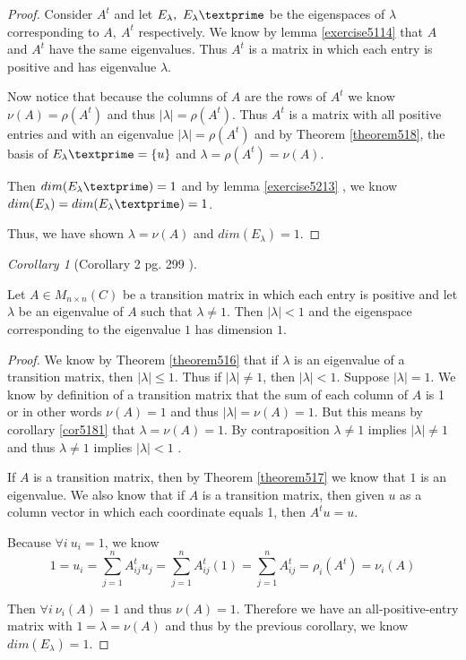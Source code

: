 \documentclass{amsart}
\theoremstyle{definition}
\theoremstyle{remark}
\newtheorem{corollary}{Corollary}[theorem]
\numberwithin{equation}{section}
\begin{document}
\begin{proof}

	Consider $A^t$ and let $E_{\lambda},\ E_{\lambda}\textprime$ be the eigenspaces of $\lambda$ corresponding to $A,\ A^t$ respectively.
	We know by lemma \ref{exercise5114} that $A$ and $A^t$ have the same eigenvalues.
	Thus $A^t$ is a matrix in which each entry is positive and has eigenvalue $\lambda$.

	Now notice that because the columns of $A$ are the rows of $A^t$ we know $\nu(A) = \rho(A^t)$ and thus $|\lambda| = \rho(A^t)$.  Thus $A^t$ is a matrix with all positive entries and with an eigenvalue $|\lambda| = \rho(A^t)$ and by Theorem \ref{theorem518}, the basis of $E_{\lambda}\textprime = \{ u \}$ and $\lambda = \rho(A^t) = \nu(A)$.
	
	Then $dim(E_{\lambda}\textprime) = 1$ and by lemma \ref{exercise5213} , we know $dim(E_{\lambda}) = dim(E_{\lambda}\textprime) = 1$.
	
	Thus, we have shown $\lambda = \nu(A)$ and $dim(E_{\lambda}) = 1$.

\end{proof}



\begin{corollary}[Corollary 2 pg. 299 \cite{friedberg2003linear}]\label{cor5182}

	Let $A \in M_{n \times n}(C)$ be a transition matrix in which each entry is positive and let $\lambda$ be an eigenvalue of $A$ such that $\lambda \neq 1$.
	Then  $|\lambda| < 1$ and the eigenspace corresponding to the eigenvalue $1$ has dimension $1$.

\end{corollary}

\begin{proof}
	We know by Theorem \ref{theorem516} that if $\lambda$ is an eigenvalue of a transition matrix, then $|\lambda| \leq 1$.
	Thus if $|\lambda| \neq 1$, then $|\lambda| < 1$.
	Suppose $|\lambda| = 1$.
	We know by definition of a transition matrix that the sum of each column of $A$ is 1 or in other words $\nu(A) = 1$ and thus $|\lambda| = \nu(A) = 1$.
	But this means by corollary \ref{cor5181} that $\lambda = \nu(A) = 1$.
	By contraposition $\lambda \neq 1$ implies $|\lambda| \neq  1$ and thus $\lambda \neq 1$ implies $|\lambda| <  1$ .

	If $A$ is a transition matrix, then by Theorem \ref{theorem517} we know that $1$ is an eigenvalue. 
	We also know that if $A$ is a transition matrix, then given $u$ as a column vector in which each coordinate equals 1, then $A^tu = u$.

	Because $\forall i\ u_i = 1$, we know
	 $$1 = u_i = \sum_{j = 1}^nA^t_{ij}u_j = \sum_{j = 1}^nA^t_{ij}(1) =  \sum_{j = 1}^nA^t_{ij} = \rho_i(A^t) = \nu_i(A)$$

	Then $\forall i\ \nu_i(A) = 1$ and thus $\nu(A) = 1$.
	Therefore we have an all-positive-entry matrix with $1 = \lambda = \nu(A) $ and thus by the previous corollary, we know $dim(E_{\lambda}) = 1$.


\end{proof}
\end{document}
